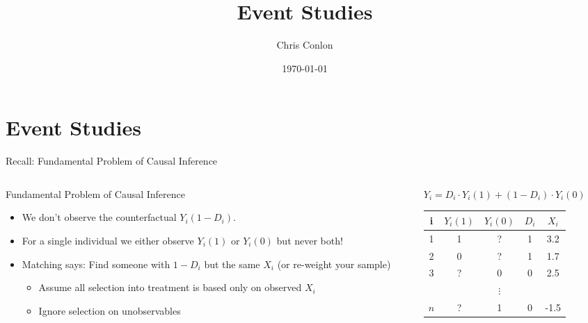 \documentclass[aspectratio=169,11pt]{beamer}
\title{Event Studies}
\author{Chris Conlon}
\institute{Applied Econometrics}
\date{\today}
\begin{document}
\frame{\titlepage}

\section{Event Studies}


\begin{frame}{Recall: Fundamental Problem of Causal Inference}
\begin{columns}[T] %
\begin{column}{.65\textwidth}
Fundamental Problem of Causal Inference
\begin{itemize}
\item We don't observe the \alert{counterfactual} $Y_i(1-D_i)$.
\item For a single individual we either observe $Y_i(1)$ \alert{or} $Y_i(0)$ but never both!
\item Matching says: Find someone with $1-D_i$ but the same $X_i$ (or \alert{re-weight} your sample)
\begin{itemize}
	\item Assume all selection into treatment is based only on observed $X_i$
	\item Ignore \alert{selection on unobservables}
\end{itemize}
\end{itemize}
\end{column}%
\hfill%
\begin{column}{.38\textwidth}

  \vspace{20pt}
  
  $Y_{i} = D_{i}\cdot Y_{i}(1) + (1-D_{i}) \cdot Y_{i}(0)$\\
  \vspace{20pt}
  \begin{tabular}{ccccc}
    \toprule
    i & $Y_{i}(1)$ &  $Y_{i}(0)$ & $D_{i}$ & $X_{i}$ \\
    \midrule
    1 &     1      &     \alert{?}      &   1   & 3.2 \\
    2 &     0      &     \alert{?}      &   1   & 1.7 \\
    3 &     \alert{?}      &     0      &   0   & 2.5 \\
     & &  $\vdots$ & & \\
    $n$ &     \alert{?}      &     1      &   0   & -1.5 \\    
  \end{tabular}
\end{column}%
\end{columns}
\end{frame}
\end{document}
